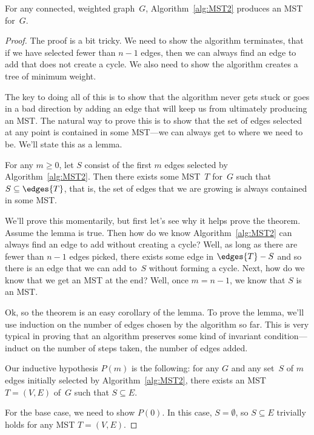 \begin{theorem}\label{thm:MST2}
For any connected, weighted graph~$G$, Algorithm~\ref{alg:MST2}
produces an MST for~$G$.
\end{theorem}

\begin{proof}
The proof is a bit tricky.  We need to show the algorithm terminates,
\ie that if we have selected fewer than $n - 1$ edges, then we can
always find an edge to add that does not create a cycle.  We also need
to show the algorithm creates a tree of minimum weight.

The key to doing all of this is to show that the algorithm never gets
stuck or goes in a bad direction by adding an edge that will keep us
from ultimately producing an MST\@.  The natural way to prove this is
to show that the set of edges selected at any point is contained in
some MST---\ie we can always get to where we need to be.  We'll state
this as a lemma.

\begin{lemma}\label{lemma:MST2}
  For any $m \ge 0$, let $S$ consist of the first $m$ edges selected by
  Algorithm~\ref{alg:MST2}.  Then there exists some MST~$T$ for~$G$ such
  that $S \subseteq \edges{T}$, that is, the set of edges that we are
  growing is always contained in some MST\@.
\end{lemma}

We'll prove this momentarily, but first let's see why it helps prove the
theorem.  Assume the lemma is true.  Then how do we know
Algorithm~\ref{alg:MST2} can always find an edge to add without creating a
cycle?  Well, as long as there are fewer than $n - 1$ edges picked, there
exists some edge in $\edges{T} - S$ and so there is an edge that we can
add to~$S$ without forming a cycle.  Next, how do we know that we get an
MST at the end?  Well, once $m = n - 1$, we know that $S$ is an MST\@.

Ok, so the theorem is an easy corollary of the lemma.  To prove the
lemma, we'll use induction on the number of edges chosen by the
algorithm so far.  This is very typical in proving that an algorithm
preserves some kind of invariant condition---induct on the number of
steps taken, \ie the number of edges added.

Our inductive hypothesis $P(m)$ is the following: for any $G$ and any
set~$S$ of $m$ edges initially selected by Algorithm~\ref{alg:MST2},
there exists an MST $T = (V, E)$ of~$G$ such that $S \subseteq E$.

For the base case, we need to show $P(0)$.  In this case, $S =
\emptyset$, so $S \subseteq E$ trivially holds for any MST $T = (V,
E)$.


\end{proof}
